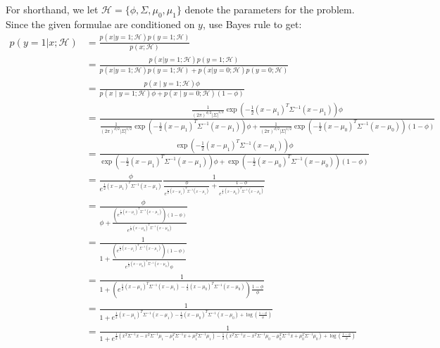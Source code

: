 \documentclass{article}
\newenvironment{answer}{\sf \begingroup\color{ForestGreen}}{\endgroup}%
\newcommand{\mc}[1]{\mathcal{#1}}
\begin{document}
\begin{answer}
  For shorthand, we let $\mc{H} = \{\phi, \Sigma, \mu_{0}, \mu_1\}$ denote
  the parameters for the problem.
  Since the given formulae are conditioned on $y$, use Bayes rule to get:
  \begin{align*}
    p(y =1\vert  x ; \mc{H}) &= \frac {p(x\vert y=1; \mc{H}) p(y=1; \mc{H})} {p(x; \mc{H})}\\
    & = \frac {p(x\vert y=1; \mc{H}) p(y=1; \mc{H})}
      {p(x\vert y=1; \mc{H}) p(y=1; \mc{H}) + p(x\vert y={0}; \mc{H}) p(y={0};
      \mc{H})}\\
    &=
    \frac{p(x \mid y=1; \mc{H}) \phi}{p(x \mid y=1; \mc{H}) \phi + p(x \mid y=0; \mc{H})(1- \phi)} \\
    &= \frac{\frac{1}{(2\pi)^{d/2} \vert \Sigma \vert ^{1/2}}\exp\left(-\frac{1}{2}(x-\mu_1)^T \Sigma^{-1}(x-\mu_1)\right) \phi}{ \frac{1}{(2\pi)^{d/2} \vert \Sigma \vert^{1/2}}\exp\left(-\frac{1}{2}(x-\mu_1)^T \Sigma^{-1}(x-\mu_1)\right) \phi +  \frac{1}{(2\pi)^{d/2} \vert \Sigma \vert ^{1/2}}\exp\left(-\frac{1}{2}(x-\mu_0)^T \Sigma^{-1}(x-\mu_0)\right) (1-\phi)} \\
    &= \frac{\exp\left(-\frac{1}{2}(x-\mu_1)^T \Sigma^{-1}(x-\mu_1)\right) \phi}{\exp\left(-\frac{1}{2}(x-\mu_1)^T \Sigma^{-1}(x-\mu_1)\right) \phi +  \exp\left(-\frac{1}{2}(x-\mu_0)^T \Sigma^{-1}(x-\mu_0)\right) (1-\phi)} \\
    &= \frac{\phi}{e^{\frac{1}{2}(x-\mu_1)^T \Sigma^{-1}(x-\mu_1)}} \frac{1}{\frac{\phi}{e^{\frac{1}{2}(x-\mu_1)^T \Sigma^{-1}(x-\mu_1)}} + \frac{1-\phi}{e^{\frac{1}{2}(x-\mu_0)^T \Sigma^{-1}(x-\mu_0)}}} \\
    &= \frac{\phi}{\phi + \frac{\left( e^{\frac{1}{2}(x-\mu_1)^T \Sigma^{-1}(x-\mu_1)} \right)(1-\phi)}{e^{\frac{1}{2}(x-\mu_0)^T \Sigma^{-1}(x-\mu_0)}}} \\
    &= \frac{1}{1 + \frac{\left( e^{\frac{1}{2}(x-\mu_1)^T \Sigma^{-1}(x-\mu_1)} \right)(1-\phi)}{e^{\frac{1}{2}(x-\mu_0)^T \Sigma^{-1}(x-\mu_0)} \phi}} \\
    &= \frac{1}{1 + \left( e^{\frac{1}{2}(x-\mu_1)^T \Sigma^{-1}(x-\mu_1) - \frac{1}{2}(x-\mu_0)^T \Sigma^{-1}(x-\mu_0)} \right)\frac{1-\phi}{\phi}} \\
    &= \frac{1}{1 + e^{\frac{1}{2}(x-\mu_1)^T \Sigma^{-1}(x-\mu_1) - \frac{1}{2}(x-\mu_0)^T \Sigma^{-1}(x-\mu_0) + \log\left(\frac{1-\phi}{\phi}\right)}} \\
    &= \frac{1}{1 + e^{\frac{1}{2}(x^T\Sigma^{-1}x-x^T\Sigma^{-1}\mu_1-\mu_1^T\Sigma^{-1}x+\mu_1^T\Sigma^{-1}\mu_1) - \frac{1}{2}(x^T\Sigma^{-1}x-x^T\Sigma^{-1}\mu_0-\mu_0^T\Sigma^{-1}x+\mu_0^T\Sigma^{-1}\mu_0) + \log\left(\frac{1-\phi}{\phi}\right)}} \\ 

\end{align*}
\end{answer}
\end{document}
